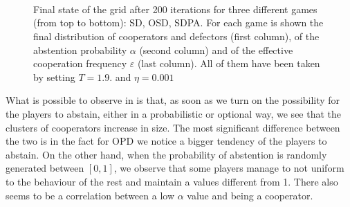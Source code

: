 \documentclass[12pt,oneside,a4paper,fleqn]{article}
\begin{document}
\begin{figure}[]
    \centering
     \\
     \\
     \\
    \caption{Final state of the grid after 200 iterations for three different games (from top to bottom): SD, OSD, SDPA. For each game is shown the final distribution of cooperators and defectors (first column), of the abstention probability $\alpha$ (second column) and of the effective cooperation frequency $\varepsilon$ (last column). All of them have been taken by setting $T = 1.9$. and $\eta = 0.001$}
    \label{fig: screenshots of SD OSD SDPA}
\end{figure}

What is possible to observe in  is that, as soon as we turn on the possibility for the players to abstain, either in a probabilistic or optional way, we see that the clusters of cooperators increase in size.
The most significant difference between the two is in the fact for OPD we notice a bigger tendency of the players to abstain. 
On the other hand, when the probability of abstention is randomly generated between $[0,1]$, we observe that some players manage to not uniform to the behaviour of the rest and maintain a values different from 1.
There also seems to be a correlation between a low $\alpha$ value and being a cooperator.
\end{document}
